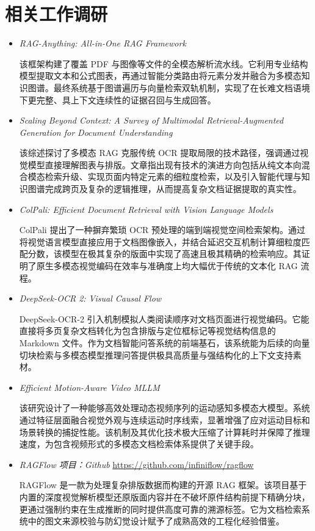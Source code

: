 \section{相关工作调研}


\begin{itemize}

    \item \textit{RAG-Anything: All-in-One RAG Framework} \cite{guo2025raganythingallinoneragframework}
    
    该框架构建了覆盖 PDF 与图像等文件的全模态解析流水线。它利用专业结构模型提取文本和公式图表，再通过智能分类路由将元素分发并融合为多模态知识图谱。最终系统基于图谱遍历与向量检索双轨机制，实现了在长难文档语境下更完整、具上下文连续性的证据召回与生成回答。

    \item \textit{Scaling Beyond Context: A Survey of Multimodal Retrieval-Augmented Generation for Document Understanding} \cite{gao2025scaling}
    
    该综述探讨了多模态 RAG 克服传统 OCR 提取局限的技术路径，强调通过视觉模型直接理解图表与排版。文章指出现有技术的演进方向包括从纯文本向混合模态检索升级、实现页面内特定元素的细粒度检索，以及引入智能代理与知识图谱完成跨页及复杂的逻辑推理，从而提高复杂文档证据提取的真实性。

    \item \textit{ColPali: Efficient Document Retrieval with Vision Language Models} \cite{faysse2024colpali}
    
    ColPali 提出了一种摒弃繁琐 OCR 预处理的端到端视觉空间检索架构。通过将视觉语言模型直接应用于文档图像嵌入，并结合延迟交互机制计算细粒度匹配分数，该模型在极其复杂的版面中实现了高速且极其精确的检索响应。其证明了原生多模态视觉编码在效率与准确度上均大幅优于传统的文本化 RAG 流程。

    \item \textit{DeepSeek-OCR 2: Visual Causal Flow} \cite{wei2026deepseekocr2visualcausal}
    
    DeepSeek-OCR-2 引入机制模拟人类阅读顺序对文档页面进行视觉编码。它能直接将多页复杂文档转化为包含排版与定位框标记等视觉结构信息的 Markdown 文件。作为文档智能问答系统的前端基石，该系统能为后续的向量切块检索与多模态模型推理问答提供极具高质量与强结构化的上下文支持素材。

    \item \textit{Efficient Motion-Aware Video MLLM} \cite{zhao2025efficientmotionawarevideomllm}
    
    该研究设计了一种能够高效处理动态视频序列的运动感知多模态大模型。系统通过特征层面融合视觉外观与连续运动时序线索，显著增强了应对运动目标和场景转换的捕捉性能。该机制及其优化技术极大压缩了计算耗时并保障了推理速度，为包含视频形式的多模态文档检索体系提供了关键手段。

    \item \textit{RAGFlow 项目：Github} \url{https://github.com/infiniflow/ragflow}
    
    RAGFlow 是一款为处理复杂排版数据而构建的开源 RAG 框架。该项目基于内置的深度视觉解析模型还原版面内容并在不破坏原件结构前提下精确分块，更通过强制约束在生成推断的同时提供高度可靠的溯源标签。它为文档检索系统中的图文来源校验与防幻觉设计赋予了成熟高效的工程化经验借鉴。
\end{itemize}